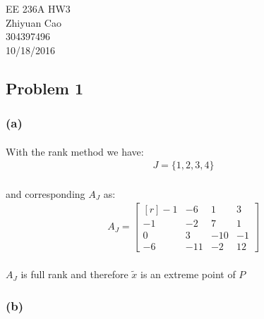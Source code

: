 \documentclass[12pt]{article}
\begin{document}
 
\begin{flushright}
	EE 236A HW3 \\
	Zhiyuan Cao \\
	304397496   \\
	10/18/2016  
\end{flushright}
 
 
\subsection*{Problem 1}
\subsubsection*{(a)}
\paragraph*{}
With the rank method we have:
\begin{align*}
J = \{1, 2, 3, 4\}
\end{align*}
\paragraph{}
and corresponding $A_J$ as:
\begin{align*}
A_J = 
\begin{bmatrix*}[r]
-1&-6&1&3\\ 
-1&-2&7&1\\
 0&3&-10&-1\\
-6&-11&-2&12 
\end{bmatrix*}
\end{align*}
\paragraph*{}
$A_J$ is full rank and therefore $\tilde{x}$ is an extreme point of $P$
\subsubsection*{(b)}
\end{document}
